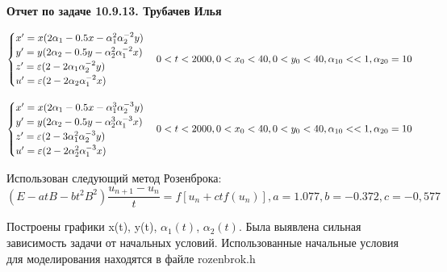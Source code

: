 \documentclass[a4paper, 12pt]{article}
\begin{document}
	\begin{center}
		\textbf{Отчет по задаче 10.9.13. Трубачев Илья}
	\end{center}

	\begin{equation*}
	\begin{cases}
	x' = x(2\alpha_1 - 0.5x - \alpha_1^2\alpha_2^{-2}y) \\
	y' = y(2\alpha_2 - 0.5y - \alpha_2^2\alpha_1^{-2}x) \\
	z' = \varepsilon(2 - 2\alpha_1\alpha_2^{-2}y) \\
	u' = \varepsilon(2 - 2\alpha_2\alpha_1^{-2}x)
	\end{cases} \\
	0 < t < 2000, 0 < x_0 < 40, 0 < y_0 < 40, \alpha_{10} << 1, \alpha_{20} = 10
	\end{equation*}
	
	\begin{equation*}
	\begin{cases}
	x' = x(2\alpha_1 - 0.5x - \alpha_1^3\alpha_2^{-3}y) \\
	y' = y(2\alpha_2 - 0.5y - \alpha_2^3\alpha_1^{-3}x) \\
	z' = \varepsilon(2 - 3\alpha_1^2\alpha_2^{-3}y) \\
	u' = \varepsilon(2 - 2\alpha_2^2\alpha_1^{-3}x)
	\end{cases} \\
	0 < t < 2000, 0 < x_0 < 40, 0 < y_0 < 40, \alpha_{10} << 1, \alpha_{20} = 10
	\end{equation*}
	
	Использован следующий метод Розенброка:
	\begin{equation*}
		(E - atB - bt^2B^2)\frac{u_{n+1} - u_n}{t} = f[u_n + ctf(u_n)], a = 1.077, b = -0.372, c = -0,577
	\end{equation*}
	
	Построены графики x(t), y(t), $\alpha_1(t)$, $ \alpha_2(t)$. Была выявлена сильная зависимость задачи от начальных условий. Использованные начальные условия для моделирования находятся в файле rozenbrok.h
\end{document}
